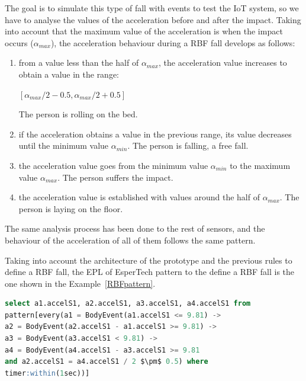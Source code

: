 \documentclass[journal]{IEEEtran}
\begin{document}
The goal is to simulate this type of fall with events to test the IoT system, so we have to analyse the values of 
the acceleration before and after the impact. Taking into account that the maximum value of the acceleration is 
when the impact occurs ($\alpha_{max}$), the acceleration behaviour
during a RBF fall develops as follows:
\begin{enumerate}
 \item from a value less than the half of $\alpha_{max}$, the acceleration value increases to obtain a value in the range:
  \begin{center}
  $[\alpha_{max}/2 - 0.5, \alpha_{max}/2 + 0.5]$
  \end{center}
 The person is rolling on the bed.
 \item if the acceleration obtains a value in the previous range, its value decreases until the minimum value $\alpha_{min}$.
 The person is falling, a free fall.
 \item the acceleration value goes from the minimum value $\alpha_{min}$ to the maximum value $\alpha_{max}$. The person
 suffers the impact.
 \item the acceleration value is established with values around the half of $\alpha_{max}$. The person is laying on the floor. 
\end{enumerate}

The same analysis process has been done to the rest of sensors, and the behaviour of the acceleration of all of them 
follows the same pattern.

Taking into account the architecture of the prototype and the previous rules to define a RBF fall, the EPL of EsperTech
pattern to the define a RBF fall is the one shown in the Example~\ref{RBFpattern}.

\begin{lstlisting}[basicstyle=\ttfamily\scriptsize,language=SQL, mathescape,caption=RBF pattern,label=RBFpattern]
select a1.accelS1, a2.accelS1, a3.accelS1, a4.accelS1 from 
pattern[every(a1 = BodyEvent(a1.accelS1 <= 9.81) -> 
a2 = BodyEvent(a2.accelS1 - a1.accelS1 >= 9.81) ->
a3 = BodyEvent(a3.accelS1 < 9.81) ->
a4 = BodyEvent(a4.accelS1 - a3.accelS1 >= 9.81 
and a2.accelS1 = a4.accelS1 / 2 $\pm$ 0.5) where 
timer:within(1sec))]
\end{lstlisting}
\end{document}
